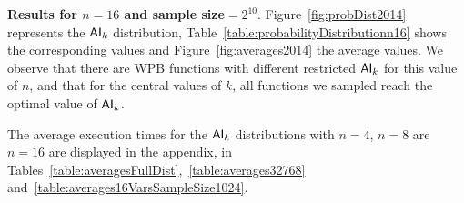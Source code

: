 \documentclass[11pt]{llncs}
\begin{document}
\textbf{Results for $n=16$ and sample size$=2^{10}$}.
Figure~\ref{fig:probDist2014} represents the $\mathsf{AI}_{k}$ distribution, Table~\ref{table:probabilityDistributionn16} shows the corresponding values and Figure~\ref{fig:averages2014} the average values.
We observe that there are WPB functions with different restricted $\mathsf{AI}_{k}$ for this value of $n$, and that for the central values of $k$, all functions we sampled reach the optimal value of $\mathsf{AI}_{k}$.

The average execution times for the $\mathsf{AI}_{k}$ distributions with $n=4$, $n=8$ are $n=16$ are displayed in the appendix, in Tables~\ref{table:averagesFullDist},~\ref{table:averages32768} and~\ref{table:averages16VarsSampleSize1024}.



\end{document}
